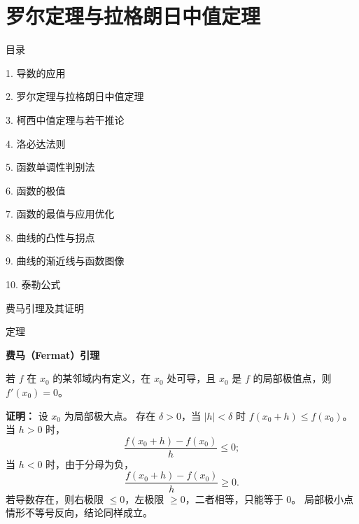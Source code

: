 \documentclass[aspectratio=169,10pt,fontset=fandol]{ctexbeamer}
\begin{document}
\section{罗尔定理与拉格朗日中值定理}
\begin{frame}[t,fragile]{目录}
\normalsize
{\color{black}\normalsize 1. 导数的应用\par}\vspace{0.22em}
{\color{blue}\normalsize 2. 罗尔定理与拉格朗日中值定理\par}\vspace{0.22em}
{\color{gray!40}\normalsize 3. 柯西中值定理与若干推论\par}\vspace{0.22em}
{\color{gray!40}\normalsize 4. 洛必达法则\par}\vspace{0.22em}
{\color{gray!40}\normalsize 5. 函数单调性判别法\par}\vspace{0.22em}
{\color{gray!40}\normalsize 6. 函数的极值\par}\vspace{0.22em}
{\color{gray!40}\normalsize 7. 函数的最值与应用优化\par}\vspace{0.22em}
{\color{gray!40}\normalsize 8. 曲线的凸性与拐点\par}\vspace{0.22em}
{\color{gray!40}\normalsize 9. 曲线的渐近线与函数图像\par}\vspace{0.22em}
{\color{gray!40}\normalsize 10. 泰勒公式\par}\vspace{0.22em}
\end{frame}
\begin{frame}[t,fragile]{费马引理及其证明}
\normalsize
\begin{block}{定理}
{\normalsize
\textbf{费马（Fermat）引理}\par

若 $f$ 在 $x_0$ 的某邻域内有定义，在 $x_0$ 处可导，且 $x_0$ 是 $f$ 的局部极值点，则 $f'(x_0)=0$。

}
\end{block}
\pause
{\normalsize
\textbf{证明：}
设 $x_0$ 为局部极大点。 存在 $\delta>0$，当 $|h|<\delta$ 时 $f(x_0+h)\leq f(x_0)$。 当 $h>0$ 时，
\[
\frac{f(x_0+h)-f(x_0)}{h}\leq0;
\]
当 $h<0$ 时，由于分母为负，
\[
\frac{f(x_0+h)-f(x_0)}{h}\geq0.
\]
若导数存在，则右极限 $\leq0$，左极限 $\geq0$，二者相等，只能等于 $0$。 局部极小点情形不等号反向，结论同样成立。

}
\end{frame}
\end{document}
